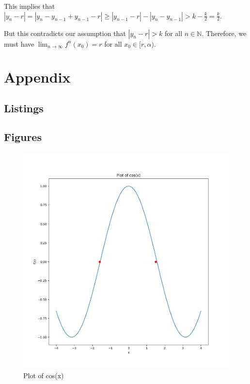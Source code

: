 \documentclass[11pt]{article}
\begin{document}
This implies that $|y_n - r| = |y_n - y_{n-1} + y_{n-1} - r| \geq |y_{n-1} - r| - |y_n - y_{n-1}| > k - \frac{k}{2} = \frac{k}{2}$. 

But this contradicts our assumption that $|y_n - r| > k$ for all $n\in\mathbb{N}$. Therefore, we must have $\lim_{n\to\infty} f^n(x_0) = r$ for all $x_0 \in [r,\alpha)$.


\appendix
\section{Appendix}
\subsection{Listings}





\subsection{Figures}
\begin{figure}[h]
    \centering
    \includegraphics{Figure_1.png}
    \caption{Plot of cos(x)}
    \label{fig:cos}
\end{figure}
\end{document}
